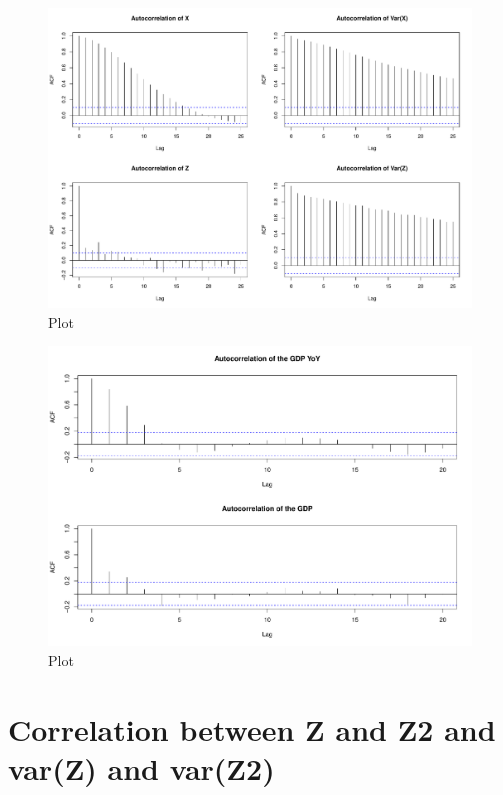 \documentclass[12pt,a4paper,oneside]{book}
\begin{document}
\begin{figure}[H]
    \centering
    \captionsetup{justification=centering}
    \includegraphics[scale=0.5]{Graphs/ACF.pdf}
    \caption{Plot }
    \label{fig:ACF}
\end{figure}

\begin{figure}[H]
    \centering
    \captionsetup{justification=centering}
    \includegraphics[scale=0.45]{Graphs/ACF_GDP.pdf}
    \caption{Plot }
    \label{fig:ACF_GDP}
\end{figure}


\section{Correlation between Z and Z2 and var(Z) and var(Z2)}
\end{document}
